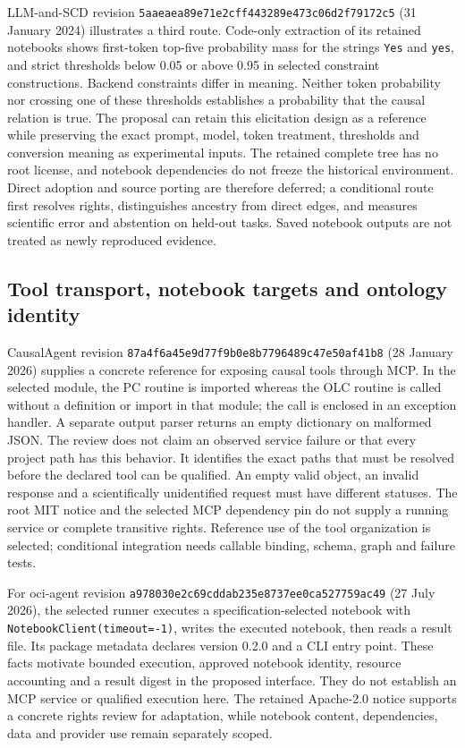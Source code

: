LLM-and-SCD revision
\texttt{5aaeaea89e71e2cff443}\allowbreak\texttt{289e473c06d2f79172c5}
(31 January 2024) illustrates a third route. Code-only extraction of its
retained notebooks shows first-token top-five probability mass for the strings
\texttt{Yes} and \texttt{yes}, and strict thresholds below 0.05 or above 0.95
in selected constraint constructions. Backend constraints differ in meaning.
Neither token probability nor crossing one of these thresholds establishes a
probability that the causal relation is true. The proposal can retain this
elicitation design as a reference while preserving the exact prompt, model,
token treatment, thresholds and conversion meaning as experimental inputs.
The retained complete tree has no root license, and notebook dependencies do
not freeze the historical environment. Direct adoption and source porting are
therefore deferred; a conditional route first resolves rights, distinguishes
ancestry from direct edges, and measures scientific error and abstention on
held-out tasks. Saved notebook outputs are not treated as newly reproduced
evidence.~\citep{exec14_iid_scd,exec25_agents_choice}

\subsection{Tool transport, notebook targets and ontology identity}
CausalAgent revision
\texttt{87a4f6a45e9d77f9b0e8}\allowbreak\texttt{b7796489c47e50af41b8}
(28 January 2026) supplies a concrete reference for exposing causal tools through
MCP. In the selected module, the PC routine is imported whereas the OLC routine
is called without a definition or import in that module; the call is enclosed
in an exception handler. A separate output parser returns an empty dictionary
on malformed JSON. The review does not claim an observed service failure or
that every project path has this behavior. It identifies the exact paths that
must be resolved before the declared tool can be qualified. An empty valid
object, an invalid response and a scientifically unidentified request must have
different statuses. The root MIT notice and the selected MCP dependency pin do
not supply a running service or complete transitive rights. Reference use of
the tool organization is selected; conditional integration needs callable
binding, schema, graph and failure tests.~\citep{exec13_data_causalagent_code,exec25_agents_choice}

For oci-agent revision
\texttt{a978030e2c69cddab235}\allowbreak\texttt{e8737ee0ca527759ac49}
(27 July 2026), the selected runner executes a specification-selected notebook
with \texttt{NotebookClient(timeout=-1)}, writes the executed notebook, then
reads a result file. Its package metadata declares version 0.2.0 and a CLI
entry point. These facts motivate bounded execution, approved notebook
identity, resource accounting and a result digest in the proposed interface.
They do not establish an MCP service or qualified execution here. The retained
Apache-2.0 notice supports a concrete rights review for adaptation, while
notebook content, dependencies, data and provider use remain separately
scoped.~\citep{exec13_data_oci_code,exec25_agents_choice}

